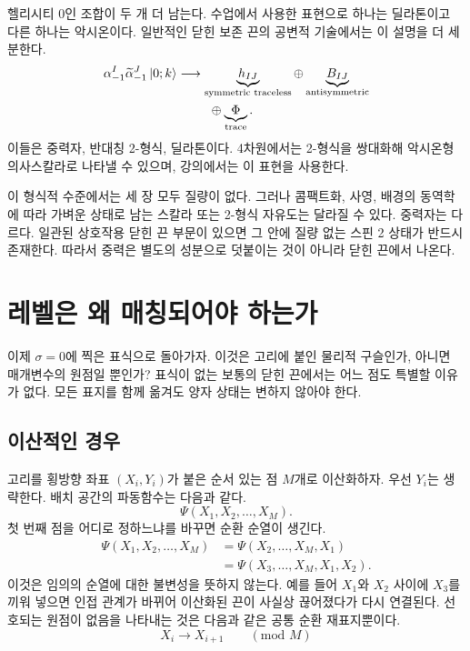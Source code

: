 헬리시티 0인 조합이 두 개 더 남는다. 수업에서 사용한 표현으로 하나는 딜라톤이고 다른 하나는 악시온이다. 일반적인 닫힌 보존 끈의 공변적 기술에서는 이 설명을 더 세분한다.
\begin{equation}
  \begin{aligned}
    \alpha_{-1}^{I}\widetilde\alpha_{-1}^{J}\left\lvert0;k\right\rangle
    &\longrightarrow
    \underbrace{h_{IJ}}_{\text{symmetric traceless}}
    \oplus
    \underbrace{B_{IJ}}_{\text{antisymmetric}}\\
    &\hspace{2.5em}\oplus
    \underbrace{\Phi}_{\text{trace}}.
  \end{aligned}
  \label{eq:l04-massless-tensor-decomposition}
\end{equation}
이들은 중력자, 반대칭 2-형식, 딜라톤이다. 4차원에서는 2-형식을 쌍대화해 악시온형 의사스칼라로 나타낼 수 있으며, 강의에서는 이 표현을 사용한다.

이 형식적 수준에서는 세 장 모두 질량이 없다. 그러나 콤팩트화, 사영, 배경의 동역학에 따라 가벼운 상태로 남는 스칼라 또는 2-형식 자유도는 달라질 수 있다. 중력자는 다르다. 일관된 상호작용 닫힌 끈 부문이 있으면 그 안에 질량 없는 스핀 2 상태가 반드시 존재한다. 따라서 중력은 별도의 성분으로 덧붙이는 것이 아니라 닫힌 끈에서 나온다.

\section{레벨은 왜 매칭되어야 하는가}

이제 \(\sigma=0\)에 찍은 표식으로 돌아가자. 이것은 고리에 붙인 물리적 구슬인가, 아니면 매개변수의 원점일 뿐인가? 표식이 없는 보통의 닫힌 끈에서는 어느 점도 특별할 이유가 없다. 모든 표지를 함께 옮겨도 양자 상태는 변하지 않아야 한다.

\subsection{이산적인 경우}

고리를 횡방향 좌표 \((X_i,Y_i)\)가 붙은 순서 있는 점 \(M\)개로 이산화하자. 우선 \(Y_i\)는 생략한다. 배치 공간의 파동함수는 다음과 같다.
\begin{equation}
  \Psi(X_1,X_2,\ldots,X_M).
\end{equation}
첫 번째 점을 어디로 정하느냐를 바꾸면 순환 순열이 생긴다.
\begin{align}
  \Psi(X_1,X_2,\ldots,X_M)
  &=
  \Psi(X_2,\ldots,X_M,X_1)\nonumber\\
  &=
  \Psi(X_3,\ldots,X_M,X_1,X_2).
  \label{eq:l04-cyclic-wavefunction}
\end{align}
이것은 임의의 순열에 대한 불변성을 뜻하지 않는다. 예를 들어 \(X_1\)와 \(X_2\) 사이에 \(X_3\)를 끼워 넣으면 인접 관계가 바뀌어 이산화된 끈이 사실상 끊어졌다가 다시 연결된다. 선호되는 원점이 없음을 나타내는 것은 다음과 같은 공통 순환 재표지뿐이다.
\begin{equation}
  X_i\longrightarrow X_{i+1}\qquad(\text{mod }M)
  \label{eq:l04-discrete-shift}
\end{equation}

